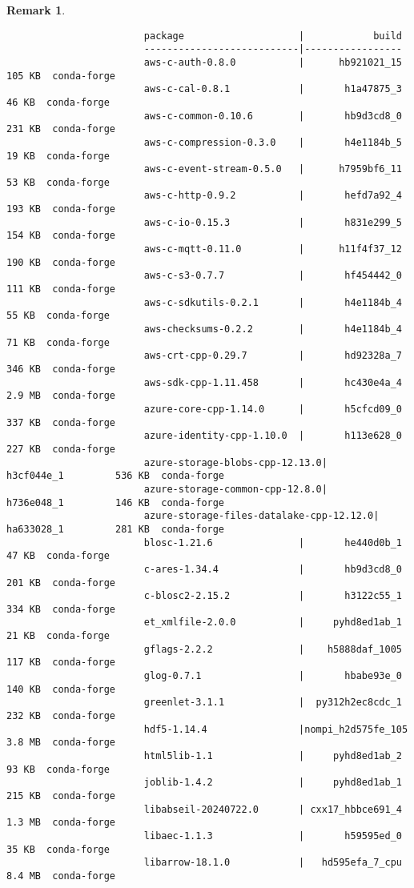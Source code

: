 \documentclass{article}
\newtheorem{remark}{Remark}
\begin{document}
\begin{enumerate}
\begin{itemize}
\begin{itemize}
\begin{itemize}
\begin{remark}
\begin{verbatim}
						package                    |            build
						---------------------------|-----------------
						aws-c-auth-0.8.0           |      hb921021_15         105 KB  conda-forge
						aws-c-cal-0.8.1            |       h1a47875_3          46 KB  conda-forge
						aws-c-common-0.10.6        |       hb9d3cd8_0         231 KB  conda-forge
						aws-c-compression-0.3.0    |       h4e1184b_5          19 KB  conda-forge
						aws-c-event-stream-0.5.0   |      h7959bf6_11          53 KB  conda-forge
						aws-c-http-0.9.2           |       hefd7a92_4         193 KB  conda-forge
						aws-c-io-0.15.3            |       h831e299_5         154 KB  conda-forge
						aws-c-mqtt-0.11.0          |      h11f4f37_12         190 KB  conda-forge
						aws-c-s3-0.7.7             |       hf454442_0         111 KB  conda-forge
						aws-c-sdkutils-0.2.1       |       h4e1184b_4          55 KB  conda-forge
						aws-checksums-0.2.2        |       h4e1184b_4          71 KB  conda-forge
						aws-crt-cpp-0.29.7         |       hd92328a_7         346 KB  conda-forge
						aws-sdk-cpp-1.11.458       |       hc430e4a_4         2.9 MB  conda-forge
						azure-core-cpp-1.14.0      |       h5cfcd09_0         337 KB  conda-forge
						azure-identity-cpp-1.10.0  |       h113e628_0         227 KB  conda-forge
						azure-storage-blobs-cpp-12.13.0|       h3cf044e_1         536 KB  conda-forge
						azure-storage-common-cpp-12.8.0|       h736e048_1         146 KB  conda-forge
						azure-storage-files-datalake-cpp-12.12.0|       ha633028_1         281 KB  conda-forge
						blosc-1.21.6               |       he440d0b_1          47 KB  conda-forge
						c-ares-1.34.4              |       hb9d3cd8_0         201 KB  conda-forge
						c-blosc2-2.15.2            |       h3122c55_1         334 KB  conda-forge
						et_xmlfile-2.0.0           |     pyhd8ed1ab_1          21 KB  conda-forge
						gflags-2.2.2               |    h5888daf_1005         117 KB  conda-forge
						glog-0.7.1                 |       hbabe93e_0         140 KB  conda-forge
						greenlet-3.1.1             |  py312h2ec8cdc_1         232 KB  conda-forge
						hdf5-1.14.4                |nompi_h2d575fe_105         3.8 MB  conda-forge
						html5lib-1.1               |     pyhd8ed1ab_2          93 KB  conda-forge
						joblib-1.4.2               |     pyhd8ed1ab_1         215 KB  conda-forge
						libabseil-20240722.0       | cxx17_hbbce691_4         1.3 MB  conda-forge
						libaec-1.1.3               |       h59595ed_0          35 KB  conda-forge
						libarrow-18.1.0            |   hd595efa_7_cpu         8.4 MB  conda-forge

\end{verbatim}
\end{remark}
\end{itemize}
\end{itemize}
\end{itemize}
\end{enumerate}
\end{document}
